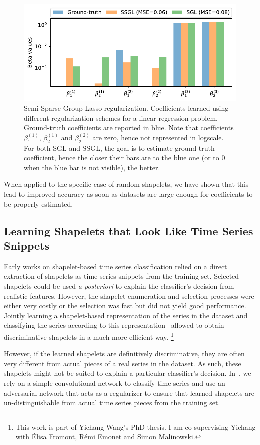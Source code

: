 \begin{figure}[t]
\centering
\includegraphics[width=.8\textwidth]{fig/ssgl}
\caption{Semi-Sparse Group Lasso regularization. Coefficients learned using
different regularization schemes for a linear regression problem. Ground-truth
coefficients are reported in blue.
Note that coefficients $\beta_1^{(1)}$, $\beta_2^{(1)}$ and $\beta_2^{(2)}$ are
zero, hence not represented in logscale.
For both SGL and SSGL, the goal is to estimate ground-truth coefficient, hence
the closer their bars are to the blue one (or to 0 when the blue bar is not
visible), the better.
\label{fig:ssgl}}
\end{figure}

When applied to the specific case of random shapelets, we have shown that this
lead to improved accuracy as soon as datasets are large enough for coefficients
to be properly estimated.

\subsection{Learning Shapelets that Look Like Time Series Snippets}

Early works on shapelet-based time series classification relied on a direct
extraction of shapelets as time series snippets from the training set.
Selected shapelets could be used \emph{a posteriori} to explain the classifier's
decision from realistic features.
However, the shapelet enumeration and selection processes were either very
costly or the selection was fast but did not yield good performance.
Jointly learning a shapelet-based representation of the series in the dataset
and classifying the series according to this
representation~\cite{grabocka2014learning} allowed to obtain
discriminative shapelets in a much more efficient way.%
\footnote{This work is part of Yichang Wang's PhD thesis.
I am co-supervising Yichang with Élisa Fromont, Rémi Emonet and Simon
Malinowski.}

However, if the learned shapelets are definitively discriminative, they are
often very different from actual pieces of a real series in the
dataset. As such, these shapelets might not be suited to explain a particular
classifier's decision.
In~\cite{wang2019},
we rely on a simple convolutional network to classify time
series and use an adversarial network that acts as a regularizer to ensure that
learned shapelets are un-distinguishable from actual time series pieces from
the training set.
